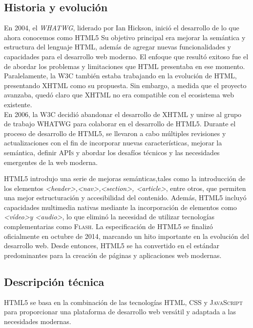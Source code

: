 \documentclass[a4paper, 11pt]{book}
\begin{document}
\subsection{Historia y evolución}
En 2004, el \emph{WHATWG}, liderado por Ian Hickson, inició el desarrollo de lo que ahora conocemos como \textsc{HTML5}  Su objetivo principal era mejorar la semántica y estructura del lenguaje \textsc{HTML}, además de agregar nuevas funcionalidades y capacidades para el desarrollo web moderno. El enfoque que resultó exitoso fue el de abordar los problemas y limitaciones que \textsc{HTML} presentaba en ese momento.
Paralelamente, la \textsc{W3C} también estaba trabajando en la evolución de \textsc{HTML}, presentando \textsc{XHTML} como su propuesta. Sin embargo, a medida que el proyecto avanzaba, quedó claro que \textsc{XHTML} no era compatible con el ecosistema web existente.\\
En 2006, la \textsc{W3C} decidió abandonar el desarrollo de \textsc{XHTML} y unirse al grupo de trabajo \textsc{WHATWG} para colaborar en el desarrollo de \textsc{HTML5}.
Durante el proceso de desarrollo de \textsc{HTML5}, se llevaron a cabo múltiples revisiones y actualizaciones con el fin de incorporar nuevas características, mejorar la semántica, definir \textsc{APIs} y abordar los desafíos técnicos y las necesidades emergentes de la web moderna.

\textsc{HTML5} introdujo una serie de mejoras semánticas,tales como la introducción de los elementos \emph{\textless header\textgreater ,\textless nav\textgreater,\textless section\textgreater, \textless article\textgreater}, entre otros, que permiten una mejor estructuración y accesibilidad del contenido. Además, \textsc{HTML5} incluyó capacidades multimedia nativas mediante la incorporación de elementos como \emph{\textless vídeo\textgreater y \textless audio\textgreater}, lo que eliminó la necesidad de utilizar tecnologías complementarias como \textsc{Flash}.
La especificación de \textsc{HTML5} se finalizó oficialmente en octubre de 2014, marcando un hito importante en la evolución del desarrollo web.
Desde entonces, \textsc{HTML5} se ha convertido en el estándar predominantes para la creación de páginas y aplicaciones web modernas.
\subsection{Descripción técnica}
\textsc{HTML5} se basa en la combinación de las tecnologías \textsc{HTML}, \textsc{CSS} y \textsc{JavaScript} para proporcionar una plataforma de desarrollo web versátil y adaptada a las necesidades modernas. 
\end{document}
